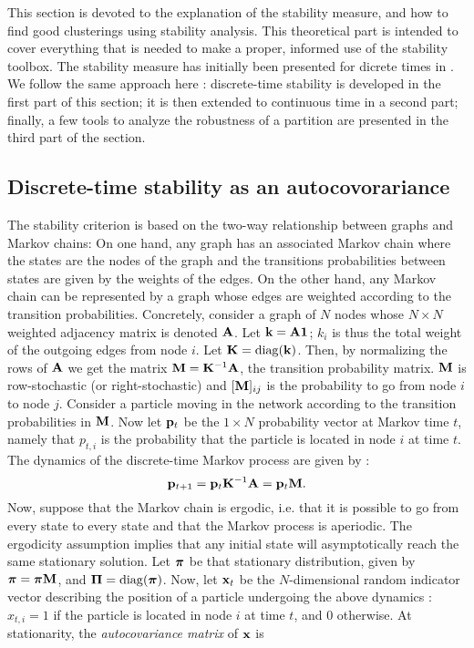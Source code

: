 This section is devoted to the explanation of the stability measure, and how to find good clusterings using stability analysis. This theoretical part is intended to cover everything that is needed to make a proper, informed use of the stability toolbox. The stability measure has initially been presented for dicrete times in \cite{delvenne2010stability}. We follow the same approach here : discrete-time stability is developed in the first part of this section; it is then extended to continuous time in a second part; finally, a few tools to analyze the robustness of a partition are presented in the third part of the section.

\subsection{Discrete-time stability as an autocovorariance}
The stability criterion is based on the two-way relationship between graphs and Markov chains: On one hand, any graph has an associated Markov chain where the states are the nodes of the graph and the transitions probabilities between states are given by the weights of the edges. On the other hand, any Markov chain can be represented by a graph whose edges are weighted according to the transition probabilities. Concretely, consider a graph of $N$ nodes whose $N \times N$ weighted adjacency matrix is denoted $\mathbf A$. Let $\mathbf k = \mathbf A \mathbf 1$; $k_i$ is thus the total weight of the outgoing edges from node $i$. Let $\mathbf K = \mathrm{diag}(\mathbf k)$. Then, by normalizing the rows of $\mathbf A$ we get the matrix $\mathbf M = \mathbf K^{-1}\mathbf A$, the transition probability matrix. $\mathbf M$ is row-stochastic (or right-stochastic) and $[\mathbf M]_{ij}$ is the probability to go from node $i$ to node $j$. 
Consider a particle moving in the network according to the transition probabilities in $\mathbf M$. Now let $\mathbf p_t$ be the $1 \times N$ probability vector at Markov time $t$, namely that $p_{t,i}$ is the probability that the particle is located in node $i$ at time $t$. The dynamics of the discrete-time Markov process are given by :
\begin{equation} \label{eq:discreteMP}
	\mathbf p_{t+1} = \mathbf p_t \mathbf K^{-1}\mathbf A = \mathbf p_t \mathbf M.  	
\end{equation} 
Now, suppose that the Markov chain is ergodic, i.e. that it is possible to go from every state to every state and that the Markov process is aperiodic. The ergodicity assumption implies that any initial state will asymptotically reach the same stationary solution. Let $\boldsymbol \pi$ be that stationary distribution, given by $\boldsymbol \pi = \boldsymbol \pi \mathbf M$, and $\mathbf \Pi = \mathrm{diag}(\boldsymbol \pi)$. Now, let $\mathbf x_t$ be the $N$-dimensional random indicator vector describing the position of a particle undergoing the above dynamics : $x_{t,i} = 1$ if the particle is located in node $i$ at time $t$, and $0$ otherwise. At stationarity, the \textit{autocovariance matrix} of $\mathbf x$ is
